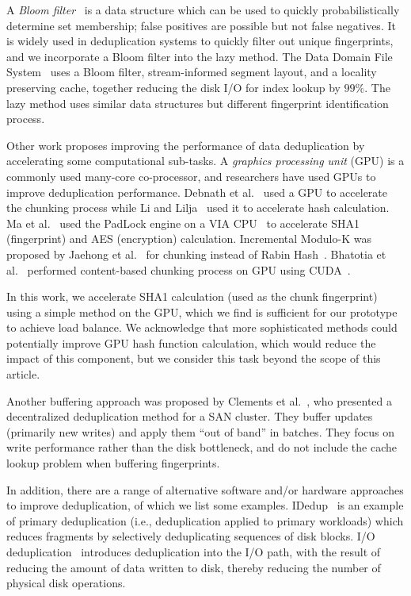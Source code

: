 \documentclass[prodmode,acmtecs]{acmsmall}
\begin{document}
A \emph{Bloom filter}~\cite{bloom1970space,bose2008false} is a data structure which can be used to quickly probabilistically determine set membership; false positives are possible but not false negatives. It is widely used in deduplication systems to quickly filter out unique fingerprints, and we incorporate a Bloom filter into the lazy method.  The Data Domain File System~\cite{zhu2008avoiding} uses a Bloom filter, stream-informed segment layout, and a locality preserving cache, together reducing the disk I/O for index lookup by $99\%$. The lazy method uses similar data structures but different fingerprint identification process.

Other work proposes improving the performance of data deduplication by accelerating some computational sub-tasks. A \emph{graphics processing unit} (GPU) is a commonly used many-core co-processor, and researchers have used GPUs to improve deduplication performance. Debnath et al.~\cite{bhatotia2012shredder} used a GPU to accelerate the chunking process while Li and Lilja~\cite{li2009highly} used it to accelerate hash calculation.  Ma et al.~\cite{ma2010towards} used the PadLock engine on a VIA CPU~\cite{via} to accelerate SHA1 (fingerprint) and AES (encryption) calculation.  Incremental Modulo-K was proposed by Jaehong et al.~\cite{min2011efficient} for chunking instead of Rabin Hash~\cite{rabin1981fingerprinting}.  Bhatotia et al.~\cite{bhatotia2012shredder} performed content-based chunking process on GPU using CUDA~\cite{cuda}.

In this work, we accelerate SHA1 calculation (used as the chunk fingerprint) using a simple method on the GPU, which we find is sufficient for our prototype to achieve load balance.  We acknowledge that more sophisticated methods could potentially improve GPU hash function calculation, which would reduce the impact of this component, but we consider this task beyond the scope of this article.

Another buffering approach was proposed by Clements et al.~\cite{clements2009decentralized}, who presented a decentralized deduplication method for a SAN cluster.  They buffer updates (primarily new writes) and apply them ``out of band'' in batches. They focus on write performance rather than the disk bottleneck, and do not include the cache lookup problem when buffering fingerprints.

In addition, there are a range of alternative software and/or hardware approaches to improve deduplication, of which we list some examples.  IDedup~\cite{srinivasan2012idedup} is an example of primary deduplication (i.e., deduplication applied to primary workloads) which reduces fragments by selectively deduplicating sequences of disk blocks. I/O deduplication~\cite{koller2010i/o} introduces deduplication into the I/O path, with the result of reducing the amount of data written to disk, thereby reducing the number of physical disk operations.
\end{document}
